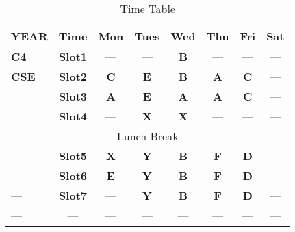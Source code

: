 \documentclass{article}
\begin{document}
	\begin{table}[h]
		\centering
		\begin{tabular}{|p{2cm}||c|c|c|c|c|c|c|}
			\hline
			\textbf{YEAR}&\textbf{Time}&\textbf{Mon}&\textbf{Tues}&\textbf{Wed}&\textbf{Thu}&\textbf{Fri}&\textbf{Sat}\\
			\hline
			\textbf{C4}&\textbf{Slot1}&---&---&\textbf{B}&---&---&---\\
			\hline
			\textbf{CSE}&\textbf{Slot2}&\textbf{C}&\textbf{E}&\textbf{B}&\textbf{A}&\textbf{C}&---\\
			\hline
			\textbf{   }&\textbf{Slot3}&\textbf{A}&\textbf{E}&\textbf{A}&\textbf{A}&\textbf{C}&---\\
			\hline
			\textbf{     }&\textbf{Slot4}&---&\textbf{X}&\textbf{X}&---&---&---\\
			\hline
			\multicolumn{8}{|c|}{Lunch Break}\\
			\hline
				---&\textbf{Slot5}&\textbf{X}&\textbf{Y}&\textbf{B}&\textbf{F}&\textbf{D}&---\\
			\hline
				---&\textbf{Slot6}&\textbf{E}&\textbf{Y}&\textbf{B}&\textbf{F}&\textbf{D}&---\\
			\hline
				---&\textbf{Slot7}&---&\textbf{Y}&\textbf{B}&\textbf{F}&\textbf{D}&---\\
			\hline
				---&---&---&---&---&---&---&---\\
			\hline
			\end{tabular}
			\caption{Time Table}
			\label{tab:Example}
		\end{table}
\end{document}

